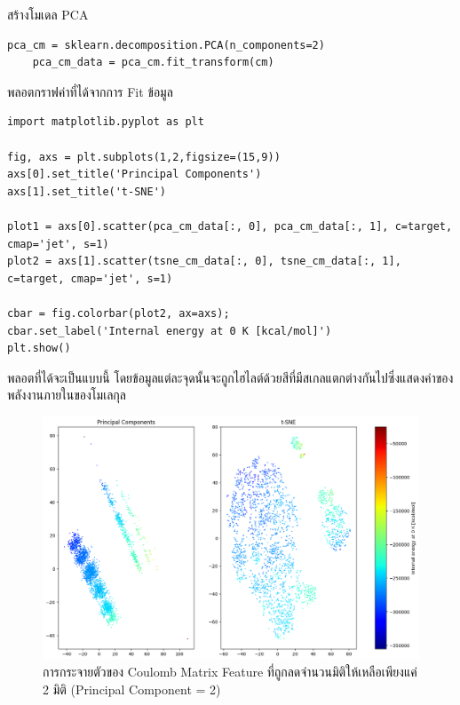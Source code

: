 \noindent สร้างโมเดล PCA
\begin{lstlisting}[style=MyPython]
    pca_cm = sklearn.decomposition.PCA(n_components=2)
    pca_cm_data = pca_cm.fit_transform(cm)
\end{lstlisting}

\noindent พลอตกราฟค่าที่ได้จากการ Fit ข้อมูล
\begin{lstlisting}[style=MyPython]
import matplotlib.pyplot as plt

fig, axs = plt.subplots(1,2,figsize=(15,9))
axs[0].set_title('Principal Components')
axs[1].set_title('t-SNE')

plot1 = axs[0].scatter(pca_cm_data[:, 0], pca_cm_data[:, 1], c=target, cmap='jet', s=1)
plot2 = axs[1].scatter(tsne_cm_data[:, 0], tsne_cm_data[:, 1], c=target, cmap='jet', s=1)

cbar = fig.colorbar(plot2, ax=axs);
cbar.set_label('Internal energy at 0 K [kcal/mol]')
plt.show()
\end{lstlisting}

\noindent พลอตที่ได้จะเป็นแบบนี้ โดยข้อมูลแต่ละจุดนั้นจะถูกไฮไลต์ด้วยสีที่มีสเกลแตกต่างกันไปซึ่งแสดงค่าของพลังงานภายในของโมเลกุล

\begin{figure}[H]
    \centering
    \includegraphics[width=\linewidth]{fig/cm_pca_tsne.png}
    \caption{การกระจายตัวของ Coulomb Matrix Feature ที่ถูกลดจำนวนมิติให้เหลือเพียงแค่ 2 มิติ (Principal Component = 2)}
    \label{fig:cm_pca_tsne}
\end{figure}
